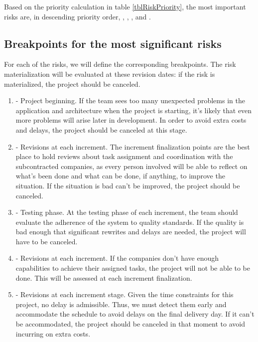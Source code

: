Based on the priority calculation in table \ref{tblRiskPriority}, the most important risks are, in descending priority order, , , ,  and .

\subsection{Breakpoints for the most significant risks}
\label{secBreakpoints}

For each of the risks, we will define the corresponding breakpoints. The risk materialization will be evaluated at these revision dates: if the risk is materialized, the project should be canceled.

\begin{enumerate}
\item {} - Project beginning. If the team sees too many unexpected problems in the application and architecture when the project is starting, it's likely that even more problems will arise later in development. In order to avoid extra costs and delays, the project should be canceled at this stage.
\item {} - Revisions at each increment. The increment finalization points are the best place to hold reviews about task assignment and coordination with the subcontracted companies, as every person involved will be able to reflect on what's been done and what can be done, if anything, to improve the situation. If the situation is bad can't be improved, the project should be canceled.
\item {} - Testing phase. At the testing phase of each increment, the team should evaluate the adherence of the system to quality standards. If the quality is bad enough that significant rewrites and delays are needed, the project will have to be canceled.
\item {} - Revisions at each increment. If the companies don't have enough capabilities to achieve their assigned tasks, the project will not be able to be done. This will be assessed at each increment finalization.
\item {} - Revisions at each increment stage. Given the time constraints for this project, no delay is admissible. Thus, we must detect them early and accommodate the schedule to avoid delays on the final delivery day. If it can't be accommodated, the project should be canceled in that moment to avoid incurring on extra costs.
\end{enumerate}
